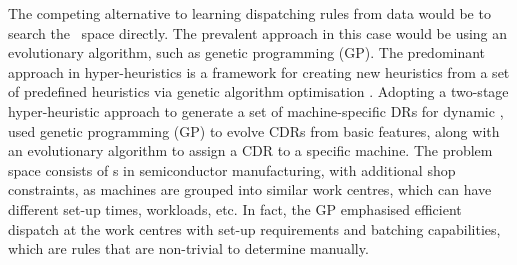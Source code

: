 \documentclass[twocolumn]{svjour3}
\begin{document}
The competing alternative to learning dispatching rules from data would be to 
search the \dr\ space directly. The prevalent approach in this case would be 
using an evolutionary algorithm, such as genetic programming (GP). 
%
The predominant approach in hyper-heuristics is a framework for creating 
new heuristics from a set of predefined heuristics via genetic algorithm 
optimisation \cite{Burke10}. 
Adopting a two-stage hyper-heuristic approach to generate a set of 
machine-specific DRs for dynamic \jsp, \cite{Pickardt2013} used genetic 
programming (GP) to evolve CDRs from basic features, along with an evolutionary 
algorithm to assign a CDR to a specific machine. 
The problem space consists of \jsp s in semiconductor manufacturing, with 
additional shop constraints, as machines are grouped into similar work centres, 
which can have different set-up times, workloads, etc. 
In fact, the GP emphasised efficient dispatch at the work centres with 
set-up requirements and batching capabilities, which are rules that are 
non-trivial to determine manually.
\end{document}
